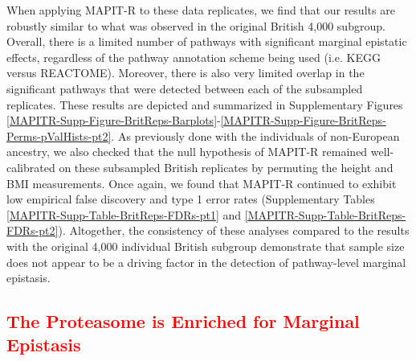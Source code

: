 \documentclass[10pt]{article}
\begin{document}
When applying MAPIT-R to these data replicates, we find that our results are robustly similar to what was observed in the original British 4,000 subgroup. Overall, there is a limited number of pathways with significant marginal epistatic effects, regardless of the pathway annotation scheme being used (i.e. KEGG versus REACTOME). Moreover, there is also very limited overlap in the significant pathways that were detected between each of the subsampled replicates. These results are depicted and summarized in Supplementary Figures \ref{MAPITR-Supp-Figure-BritReps-Barplots}-\ref{MAPITR-Supp-Figure-BritReps-Perms-pValHists-pt2}. As previously done with the individuals of non-European ancestry, we also checked that the null hypothesis of MAPIT-R remained well-calibrated on these subsampled British replicates by permuting the height and BMI measurements. Once again, we found that MAPIT-R continued to exhibit low empirical false discovery and type 1 error rates (Supplementary Tables \ref{MAPITR-Supp-Table-BritReps-FDRs-pt1} and \ref{MAPITR-Supp-Table-BritReps-FDRs-pt2}). Altogether, the consistency of these analyses compared to the results with the original 4,000 individual British subgroup demonstrate that sample size does not appear to be a driving factor in the detection of pathway-level marginal epistasis.

\subsection*{\textcolor{red}{The Proteasome is Enriched for Marginal Epistasis}}
\end{document}
